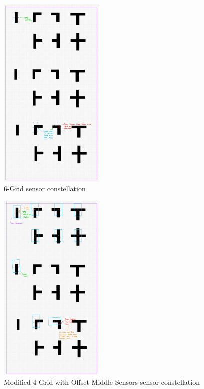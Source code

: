 \documentclass[conference]{IEEEtran}
\begin{document}
\begin{figure}[H]
	\centerline{\includegraphics[width=0.45\textwidth]{constellation-6-grid.png}}
	\caption{6-Grid sensor constellation}
	\label{fig:constellation-6-grid}
\end{figure}
\begin{figure}[H]
	\centerline{\includegraphics[width=0.45\textwidth]{constellation-4-offset.png}}
	\caption{Modified 4-Grid with Offset Middle Sensors sensor constellation}
	\label{fig:constellation-4-offset}
\end{figure}
\end{document}
